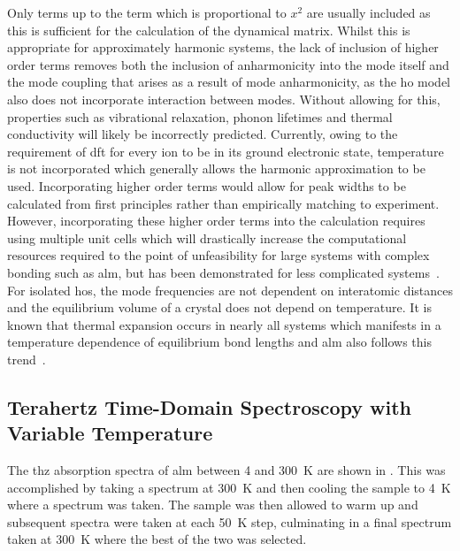 Only terms up to the term which is proportional to \(x^2\) are usually included as this is sufficient for the calculation of the dynamical matrix. Whilst this is appropriate for approximately harmonic systems, the lack of inclusion of higher order terms removes both the inclusion of anharmonicity into the mode itself and the mode coupling that arises as a result of mode anharmonicity, as the \acrshort{ho} model also does not incorporate interaction between modes. Without allowing for this, properties such as vibrational relaxation, phonon lifetimes and thermal conductivity will likely be incorrectly predicted. Currently, owing to the requirement of \acrshort{dft} for every ion to be in its ground electronic state, temperature is not incorporated which generally allows the harmonic approximation to be used. Incorporating higher order terms would allow for peak widths to be calculated from first principles rather than empirically matching to experiment. However, incorporating these higher order terms into the calculation requires using multiple unit cells which will drastically increase the computational resources required to the point of unfeasibility for large systems with complex bonding such as \acrshort{alm}, but has been demonstrated for less complicated systems~\cite{Erba2019}. For isolated \acrshort{ho}s, the mode frequencies are not dependent on interatomic distances and the equilibrium volume of a crystal does not depend on temperature. It is known that thermal expansion occurs in nearly all systems which manifests in a temperature dependence of equilibrium bond lengths and \acrshort{alm} also follows this trend~\cite{Smith2005, Schreyer2014}. 

\subsection{Terahertz Time-Domain Spectroscopy with Variable Temperature}
The \acrshort{thz} absorption spectra of \acrshort{alm} between 4 and \SI{300}{K} are shown in . This was accomplished by taking a spectrum at \SI{300}{K} and then cooling the sample to \SI{4}{K} where a spectrum was taken. The sample was then allowed to warm up and subsequent spectra were taken at each \SI{50}{K} step, culminating in a final spectrum taken at \SI{300}{K} where the best of the two was selected.


